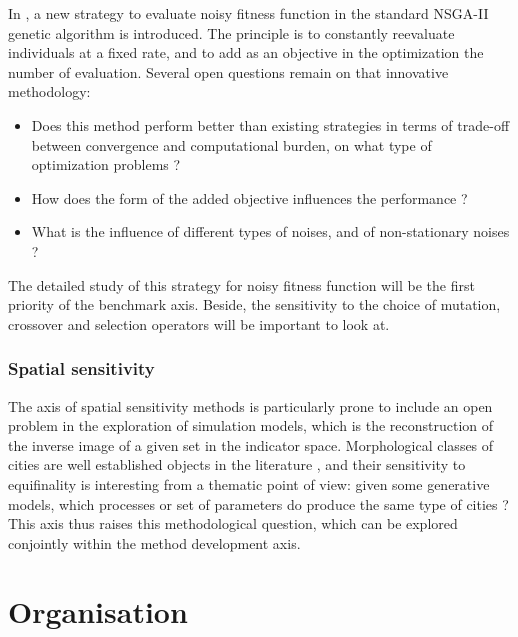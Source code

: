 In \cite{pumain2017evaluation}, a new strategy to evaluate noisy fitness function in the standard NSGA-II genetic algorithm is introduced. The principle is to constantly reevaluate individuals at a fixed rate, and to add as an objective in the optimization the number of evaluation. Several open questions remain on that innovative methodology:
\begin{itemize}
\item Does this method perform better than existing strategies in terms of trade-off between convergence and computational burden, on what type of optimization problems ?
\item How does the form of the added objective influences the performance ?
\item What is the influence of different types of noises, and of non-stationary noises ?
\end{itemize}

The detailed study of this strategy for noisy fitness function will be the first priority of the benchmark axis. Beside, the sensitivity to the choice of mutation, crossover and selection operators will be important to look at.


\subsubsection{Spatial sensitivity}

The axis of spatial sensitivity methods is particularly prone to include an open problem in the exploration of simulation models, which is the reconstruction of the inverse image of a given set in the indicator space. Morphological classes of cities are well established objects in the literature \cite{le2015forme}\cite{raimbault2017calibration}, and their sensitivity to equifinality is interesting from a thematic point of view: given some generative models, which processes or set of parameters do produce the same type of cities ? This axis thus raises this methodological question, which can be explored conjointly within the method development axis.



















\section{Organisation}


